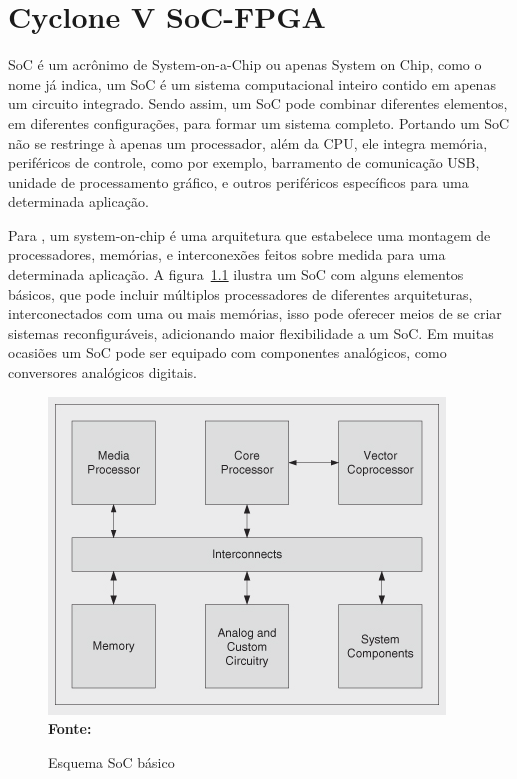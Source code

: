 \chapter{Cyclone V SoC-FPGA}\label{cap:soc}

SoC é um acrônimo de System-on-a-Chip ou apenas System on Chip, como o nome já indica, um SoC é um sistema computacional inteiro contido em apenas um circuito integrado. Sendo assim, um SoC pode combinar diferentes elementos, em diferentes configurações, para formar um sistema completo.  Portando um SoC não se restringe à apenas um processador, além da CPU,  ele integra memória, periféricos de controle, como por exemplo, barramento de comunicação USB, unidade de processamento gráfico, e outros periféricos específicos para uma determinada aplicação.  

Para , um system-on-chip é uma arquitetura que estabelece uma montagem de processadores, memórias, e interconexões feitos sobre medida para uma determinada aplicação. A figura~\ref{fig:socbasic} ilustra um SoC com alguns elementos básicos, que pode incluir múltiplos processadores  de diferentes arquiteturas, interconectados com uma ou mais memórias, isso pode oferecer meios de se criar sistemas reconfiguráveis, adicionando maior flexibilidade a um SoC.  Em muitas ocasiões um SoC pode ser equipado com componentes analógicos, como conversores analógicos digitais.


\begin{figure}[ht]
	\caption{Esquema SoC básico}
	\begin{center}
		\includegraphics[scale=0.68]{imagens/basicsoc.png}\\
		{\small \textbf{Fonte:} }
    \end{center}\label{fig:socbasic}
\end{figure}

